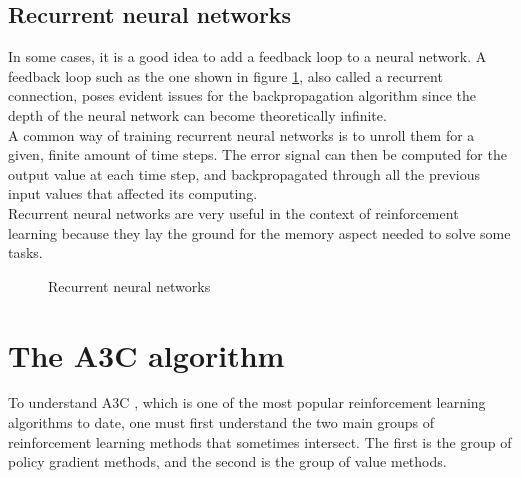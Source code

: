 \subsection{Recurrent neural networks}
In some cases, it is a good idea to add a feedback loop to a neural network. 
A feedback loop such as the one shown in figure \ref{fig:rnn}, also called
a recurrent connection, poses evident issues for the backpropagation algorithm
since the depth of the neural network can become theoretically infinite.\\

A common way of training recurrent neural networks is to unroll them for a 
given, finite amount of time steps. The error signal can then be computed
for the output value at each time step, and backpropagated through all the
previous input values that affected its computing.\\

Recurrent neural networks are very useful in the context of reinforcement 
learning because they lay the ground for the memory aspect needed to solve
some tasks.

\begin{figure}[]
	\centering
	\qquad
	\caption{Recurrent neural networks}
	\label{fig:rnn}
\end{figure}


\section{The A3C algorithm}
To understand A3C \cite{a3c}, which is one of the most popular reinforcement 
learning algorithms to date, one must first understand the two main groups of
reinforcement learning methods that sometimes intersect. The first is the 
group of policy gradient methods, and the second is the group of value 
methods.

